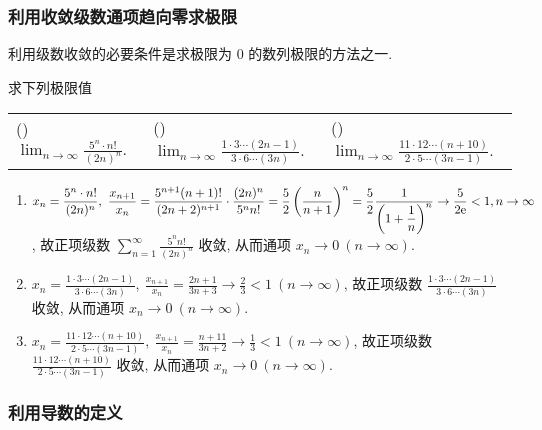 \subsubsection{利用收敛级数通项趋向零求极限}

利用级数收敛的必要条件是求极限为 $0$ 的数列极限的方法之一.

\begin{example}
    求下列极限值
    \setcounter{magicrownumbers}{0}
    \begin{table}[H]
        \centering
        \begin{tabular}{l | l | l}
            (\rownumber{}) $\displaystyle\lim_{n\to\infty}\frac{5^n\cdot n!}{(2n)^n}.$ & (\rownumber{}) $\displaystyle\lim_{n\to\infty}\frac{1\cdot3\cdots(2n-1)}{3\cdot 6\cdots(3n)}.$ & (\rownumber{}) $\displaystyle\lim_{n\to\infty}\frac{11\cdot12\cdots(n+10)}{2\cdot5\cdots(3n-1)}.$ \\
        \end{tabular}
    \end{table}
\end{example}
\begin{solution}
    \begin{enumerate}[label=(\arabic{*})]
        \item $\displaystyle x_n=\frac{5^n\cdot n!}{(2n)^n},~\frac{x_{n+1}}{x_n}=\frac{5^{n+1}(n+1)!}{(2n+2)^{n+1}}\cdot\frac{(2n)^n}{5^nn!}=\frac{5}{2}\left(\frac{n}{n+1}\right)^n=\frac{5}{2}\frac{1}{\left(1+\dfrac{1}{n}\right)^n}\to\frac{5}{2\mathrm{e} }<1,n\to\infty$,
              故正项级数 $\displaystyle\sum_{n=1}^{\infty}\frac{5^nn!}{(2n)^n}$ 收敛, 从而通项 $ x_n\to0~ (n\to\infty).$
        \item $\displaystyle x_n=\frac{1\cdot3\cdots(2n-1)}{3\cdot 6\cdots(3n)},~\frac{x_{n+1}}{x_n}=\frac{2n+1}{3n+3}\to\frac{2}{3}<1~ (n\to\infty)$,
              故正项级数 $\displaystyle\frac{1\cdot3\cdots(2n-1)}{3\cdot 6\cdots(3n)}$ 收敛, 从而通项 $ x_n\to0~ (n\to\infty).$
        \item $\displaystyle x_n=\frac{11\cdot12\cdots(n+10)}{2\cdot 5\cdots(3n-1)},~\frac{x_{n+1}}{x_n}=\frac{n+11}{3n+2}\to\frac{1}{3}<1~ (n\to\infty)$,
              故正项级数 $\displaystyle\frac{11\cdot12\cdots(n+10)}{2\cdot 5\cdots(3n-1)}$ 收敛, 从而通项 $ x_n\to0~ (n\to\infty).$
    \end{enumerate}
\end{solution}

\subsubsection{利用导数的定义}

